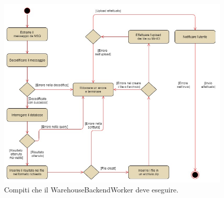 \begin{figure}[h!]
    \centering
    \includegraphics[scale=0.52]{images/workerflow3.jpg}
    \caption{Compiti che il WarehouseBackendWorker deve eseguire.}
    \label{fig:workerflow}
\end{figure}
